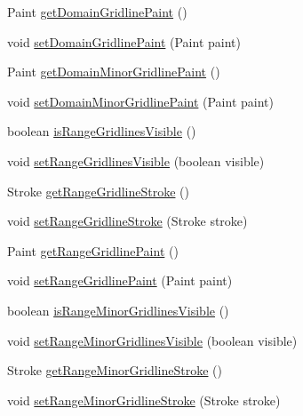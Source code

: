 \begin{DoxyCompactItemize}
\item 
Paint \mbox{\hyperlink{classorg_1_1jfree_1_1chart_1_1plot_1_1_x_y_plot_a95c888de7e6e6a42ea77151a3d993b2a}{get\+Domain\+Gridline\+Paint}} ()
\item 
void \mbox{\hyperlink{classorg_1_1jfree_1_1chart_1_1plot_1_1_x_y_plot_a1b2e660d873040b9cdc3d29a79d03e7a}{set\+Domain\+Gridline\+Paint}} (Paint paint)
\item 
Paint \mbox{\hyperlink{classorg_1_1jfree_1_1chart_1_1plot_1_1_x_y_plot_a667ca270fdac660473ef80d4ff591b01}{get\+Domain\+Minor\+Gridline\+Paint}} ()
\item 
void \mbox{\hyperlink{classorg_1_1jfree_1_1chart_1_1plot_1_1_x_y_plot_a07e0f74340d81ef71cab595e7c666c0c}{set\+Domain\+Minor\+Gridline\+Paint}} (Paint paint)
\item 
boolean \mbox{\hyperlink{classorg_1_1jfree_1_1chart_1_1plot_1_1_x_y_plot_a16bed12a303c489f3ff2a19e03ae63a7}{is\+Range\+Gridlines\+Visible}} ()
\item 
void \mbox{\hyperlink{classorg_1_1jfree_1_1chart_1_1plot_1_1_x_y_plot_a0d2df1446c52a5f9446947bf4e5ae7da}{set\+Range\+Gridlines\+Visible}} (boolean visible)
\item 
Stroke \mbox{\hyperlink{classorg_1_1jfree_1_1chart_1_1plot_1_1_x_y_plot_a4d382725d310ef5f421a94fbd8409e70}{get\+Range\+Gridline\+Stroke}} ()
\item 
void \mbox{\hyperlink{classorg_1_1jfree_1_1chart_1_1plot_1_1_x_y_plot_a4356ce9b7c42e0d4b6b5dd7d671b0ac3}{set\+Range\+Gridline\+Stroke}} (Stroke stroke)
\item 
Paint \mbox{\hyperlink{classorg_1_1jfree_1_1chart_1_1plot_1_1_x_y_plot_afe41d7b34fa30b113f4be008f8121b3d}{get\+Range\+Gridline\+Paint}} ()
\item 
void \mbox{\hyperlink{classorg_1_1jfree_1_1chart_1_1plot_1_1_x_y_plot_a18ad3cf0c12818de2620718ec02a7532}{set\+Range\+Gridline\+Paint}} (Paint paint)
\item 
boolean \mbox{\hyperlink{classorg_1_1jfree_1_1chart_1_1plot_1_1_x_y_plot_a114ea48062043f226940284401b8b4ec}{is\+Range\+Minor\+Gridlines\+Visible}} ()
\item 
void \mbox{\hyperlink{classorg_1_1jfree_1_1chart_1_1plot_1_1_x_y_plot_ae6bd0087340613ea30ea0a9d439cc9cc}{set\+Range\+Minor\+Gridlines\+Visible}} (boolean visible)
\item 
Stroke \mbox{\hyperlink{classorg_1_1jfree_1_1chart_1_1plot_1_1_x_y_plot_afcd3a70c9771ea152f93518287e18319}{get\+Range\+Minor\+Gridline\+Stroke}} ()
\item 
void \mbox{\hyperlink{classorg_1_1jfree_1_1chart_1_1plot_1_1_x_y_plot_ad75d87153b88ec024020f24ee1c683ef}{set\+Range\+Minor\+Gridline\+Stroke}} (Stroke stroke)

\end{DoxyCompactItemize}
